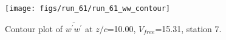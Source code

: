 \begin{figure}[H]
\centering
\texttt{[image: figs/run\_61/run\_61\_ww\_contour]}
\caption{Contour plot of $\overline{w^\prime w^\prime}$ at $z/c$=10.00, $V_{free}$=15.31, station 7.}
\label{fig:run_61_ww_contour}
\end{figure}


